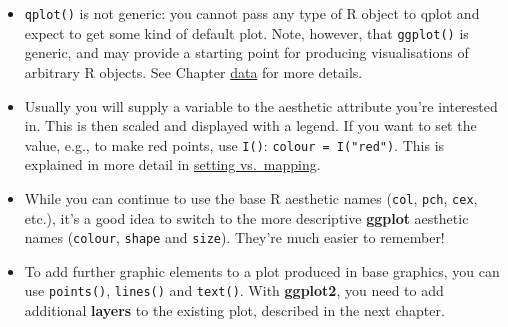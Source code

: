 \begin{itemize}
\item
  \texttt{qplot()} is not generic: you cannot pass any type of R object
  to qplot and expect to get some kind of default plot. Note, however,
  that \texttt{ggplot()} is generic, and may provide a starting point
  for producing visualisations of arbitrary R objects. See Chapter
  \hyperref[cha:data]{data} for more details.
\item
  Usually you will supply a variable to the aesthetic attribute you're
  interested in. This is then scaled and displayed with a legend. If you
  want to set the value, e.g., to make red points, use \texttt{I()}:
  \texttt{colour = I("red")}. This is explained in more detail in
  \hyperref[sub:setting-mapping]{setting vs.~mapping}.
\item
  While you can continue to use the base R aesthetic names
  (\texttt{col}, \texttt{pch}, \texttt{cex}, etc.), it's a good idea to
  switch to the more descriptive \textbf{ggplot} aesthetic names
  (\texttt{colour}, \texttt{shape} and \texttt{size}). They're much
  easier to remember!
\item
  To add further graphic elements to a plot produced in base graphics,
  you can use \texttt{points()}, \texttt{lines()} and \texttt{text()}.
  With \textbf{ggplot2}, you need to add additional \textbf{layers} to
  the existing plot, described in the next chapter.
\end{itemize}
